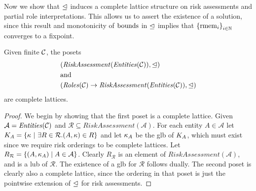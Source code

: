 Now we show that $\unlhd$ induces a complete lattice structure 
on risk assessments and partial role interpretations.  This allows
us to assert the existence of a solution, since this result
and monotonicity of $\mathrm{bounds}$ in $\unlhd$ implies that 
$\left\{\mathrm{rmem}_i\right\}_{i \in \mathbb{N}}$ converges to a fixpoint.
\begin{lemma}
\label{lemma-assessmentlattice}
Given finite $\mathcal{C}$, the posets
\begin{eqnarray*}
&(\mathit{RiskAssessment}(\mathit{Entities}(\mathcal{C})),\unlhd) \\
& \text{and} \\
&(\mathit{Roles}(\mathcal{C}) \rightarrow
\mathit{RiskAssessment}(\mathit{Entities}(\mathcal{C})),\unlhd)
\end{eqnarray*}
are complete lattices. 
\end{lemma}
\begin{proof}
We begin by showing that the first poset is a complete lattice. 
Given $\mathcal{A} = \mathit{Entities}(\mathcal{C})$ and $\mathcal{R} \subseteq
\mathit{RiskAssessment}(\mathcal{A})$.  For each entity $A \in \mathcal{A}$
let $K_A = \left\{\kappa\ |\ \exists R \in \mathcal{R}
. (A,\kappa) \in R\right\}$
and let $\kappa_A$ be the glb of $K_A$, which must exist since 
we require risk orderings to be complete lattices.  Let
$R_{\mathcal{R}} = \left\{(A,\kappa_A) \mid A \in \mathcal{A}\right\}$.
Clearly $R_{\mathcal{R}}$  is an element of 
$\mathit{RiskAssessment}(\mathcal{A})$,
and is a lub of $\mathcal{R}$.  The existence of a glb for 
$\mathcal{R}$ follows dually.  The second poset is clearly also 
a complete lattice, since the ordering in that poset is just
the pointwise extension of $\unlhd$ for risk assessments.
\end{proof}

